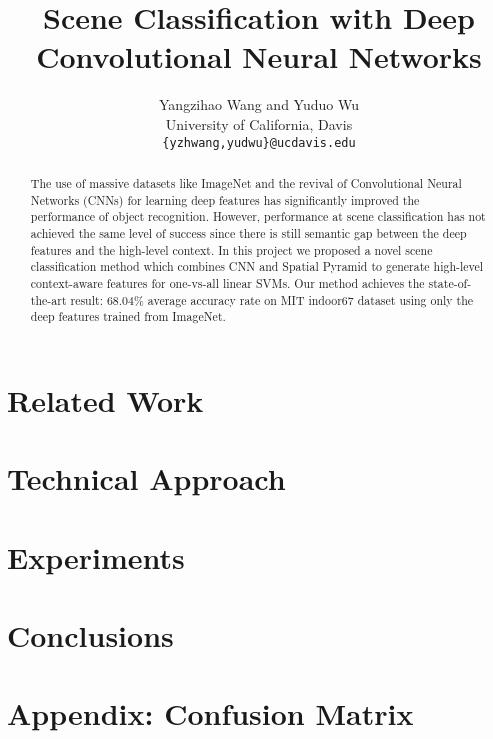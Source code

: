 \documentclass[10pt,twocolumn,letterpaper]{article}
\begin{document}
\title{Scene Classification with Deep Convolutional Neural Networks}

\author{Yangzihao Wang and Yuduo Wu\\
University of California, Davis\\
{\tt\small \{yzhwang,yudwu\}@ucdavis.edu}
}

\maketitle

\begin{abstract}
The use of massive datasets like ImageNet and the revival of Convolutional
Neural Networks (CNNs) for learning deep features has significantly improved
the performance of object recognition. However, performance at scene
classification has not achieved the same level of success since there is still
semantic gap between the deep features and the high-level context.  In this
project we proposed a novel scene classification method which combines CNN and
Spatial Pyramid to generate high-level context-aware features for one-vs-all
linear SVMs. Our method achieves the state-of-the-art result: 68.04\% average
accuracy rate on MIT indoor67 dataset using only the deep features trained from
ImageNet.

\end{abstract}

\section{Related Work}
\label{sec:related}


\section{Technical Approach}
\label{sec:method}


\section{Experiments}
\label{sec:results}



\section{Conclusions}
\label{sec:conclusion}


{\small


}

\appendix
\section*{Appendix: Confusion Matrix}

\label{sec:appendix}

\end{document}
